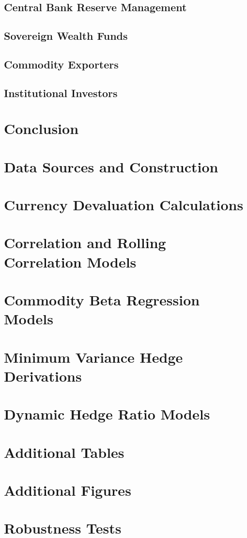 \documentclass{article}
\begin{document}
\subsection{Central Bank Reserve Management}

\subsection{Sovereign Wealth Funds}

\subsection{Commodity Exporters}

\subsection{Institutional Investors}

\section{Conclusion}

\newpage

\appendix

\section{Data Sources and Construction}

\section{Currency Devaluation Calculations}

\section{Correlation and Rolling Correlation Models}

\section{Commodity Beta Regression Models}

\section{Minimum Variance Hedge Derivations}

\section{Dynamic Hedge Ratio Models}

\section{Additional Tables}

\section{Additional Figures}

\section{Robustness Tests}

\newpage


\nocite{*}


\end{document}
